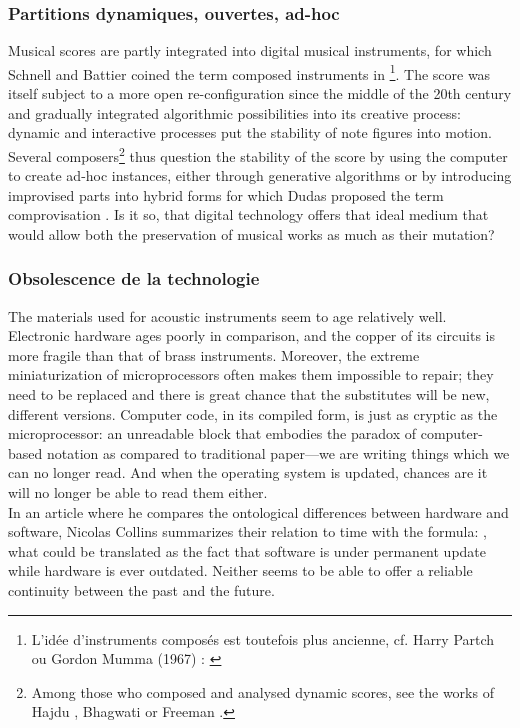 \subsubsection{Partitions dynamiques, ouvertes, ad-hoc}
\noindent  Musical scores are partly integrated into digital musical instruments, for which Schnell and Battier coined the term composed instruments in \cite{schnell_introducing_2002}\footnote{L'idée d'instruments composés est toutefois plus ancienne, cf. Harry Partch ou Gordon Mumma (1967) : \cite{mumma_creative_1967}}. The score was itself subject to a more open re-configuration since the middle of the 20th century and gradually integrated algorithmic possibilities into its creative process: dynamic and interactive processes put the stability of note figures into motion. Several composers\footnote{ Among those who composed and analysed dynamic scores, see the works of Hajdu \cite{hajdu_disposable_2016}, Bhagwati \cite{bhagwati_vexations_2017} or Freeman \cite{freeman_extreme_2008}.} thus question the stability of the score by using the computer to create ad-hoc instances, either through generative algorithms or by introducing improvised parts into hybrid forms for which Dudas proposed the term comprovisation \cite{dudas_comprovisation:_2010}. Is it so, that digital technology offers that ideal medium that would allow both the preservation of musical works as much as their mutation?

\subsubsection{Obsolescence de la technologie}

The materials used for acoustic instruments seem to age relatively well. Electronic hardware ages poorly in comparison, and the copper of its circuits is more fragile than that of brass instruments. Moreover, the extreme miniaturization of microprocessors often makes them impossible to repair; they need to be replaced and there is great chance that the substitutes will be new, different versions. Computer code, in its compiled form, is just as cryptic as the microprocessor: an unreadable block that embodies the paradox of computer-based notation as compared to traditional paper—we are writing things which we can no longer read. And when the operating system is updated, chances are it will no longer be able to read them either.\\
In an article where he compares the ontological differences between hardware and software, Nicolas Collins \cite{collins_semiconducting_2013} summarizes their relation to time with the formula: , what could be translated as the fact that software is under permanent update while hardware is ever outdated. Neither seems to be able to offer a reliable continuity between the past and the future.


